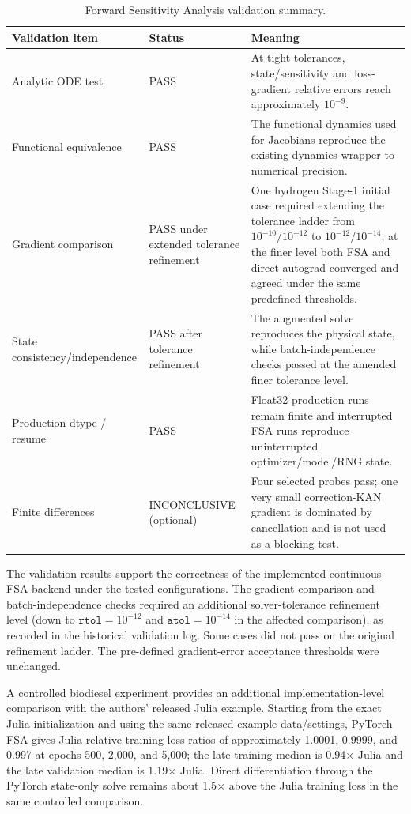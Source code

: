 \documentclass[11pt,a4paper]{article}
\begin{document}
\begin{table}[H]
\centering
\small
\caption{Forward Sensitivity Analysis validation summary.}
\label{tab:fsa_validation}
\begin{tabularx}{\textwidth}{@{}p{}p{}X@{}}
\toprule
\textbf{Validation item} & \textbf{Status} & \textbf{Meaning} \\
\midrule
Analytic ODE test & PASS & At tight tolerances, state/sensitivity and loss-gradient relative errors reach approximately $10^{-9}$. \\
Functional equivalence & PASS & The functional dynamics used for Jacobians reproduce the existing dynamics wrapper to numerical precision. \\
Gradient comparison & PASS under extended tolerance refinement & One hydrogen Stage-1 initial case required extending the tolerance ladder from $10^{-10}/10^{-12}$ to $10^{-12}/10^{-14}$; at the finer level both FSA and direct autograd converged and agreed under the same predefined thresholds. \\
State consistency/independence &
PASS after tolerance refinement &
The augmented solve reproduces the
physical state, while batch-independence
checks passed at the amended finer
tolerance level. \\
Production dtype / resume & PASS & Float32 production runs remain finite and interrupted FSA runs reproduce uninterrupted optimizer/model/RNG state. \\
Finite differences & INCONCLUSIVE (optional) & Four selected probes pass; one very small correction-KAN gradient is dominated by cancellation and is not used as a blocking test. \\
\bottomrule
\end{tabularx}
\end{table}

The validation results support the correctness of the
implemented continuous FSA backend under the tested
configurations. The gradient-comparison and batch-independence checks required an additional
solver-tolerance refinement level (down to $\texttt{rtol}=10^{-12}$ and
$\texttt{atol}=10^{-14}$ in the affected comparison), as recorded in the historical
validation log. Some cases did not pass on the original refinement ladder.
The pre-defined gradient-error acceptance thresholds were unchanged.


A controlled biodiesel experiment provides an additional implementation-level comparison with the authors' released Julia example. Starting from the exact Julia initialization and using the same released-example data/settings, PyTorch FSA gives Julia-relative training-loss ratios of approximately 1.0001, 0.9999, and 0.997 at epochs 500, 2,000, and 5,000; the late training median is 0.94$\times$ Julia and the late validation median is 1.19$\times$ Julia. Direct differentiation through the PyTorch state-only solve remains about 1.5$\times$ above the Julia training loss in the same controlled comparison.
\end{document}

